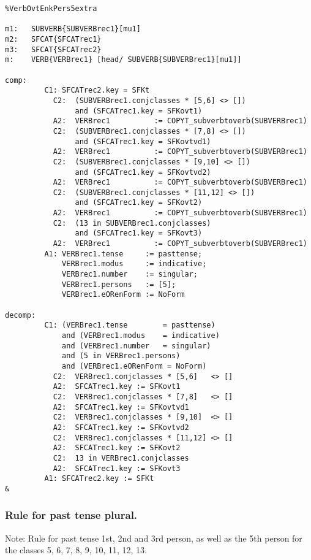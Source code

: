 \begin{verbatim}
%VerbOvtEnkPers5extra

m1:   SUBVERB{SUBVERBrec1}[mu1]
m2:   SFCAT{SFCATrec1}
m3:   SFCAT{SFCATrec2}
m:    VERB{VERBrec1} [head/ SUBVERB{SUBVERBrec1}[mu1]]

comp:
         C1: SFCATrec2.key = SFKt
           C2:  (SUBVERBrec1.conjclasses * [5,6] <> [])
                and (SFCATrec1.key = SFKovt1)
           A2:  VERBrec1          := COPYT_subverbtoverb(SUBVERBrec1)
           C2:  (SUBVERBrec1.conjclasses * [7,8] <> [])
                and (SFCATrec1.key = SFKovtvd1)
           A2:  VERBrec1          := COPYT_subverbtoverb(SUBVERBrec1)
           C2:  (SUBVERBrec1.conjclasses * [9,10] <> [])
                and (SFCATrec1.key = SFKovtvd2)
           A2:  VERBrec1          := COPYT_subverbtoverb(SUBVERBrec1)
           C2:  (SUBVERBrec1.conjclasses * [11,12] <> []) 
                and (SFCATrec1.key = SFKovt2)
           A2:  VERBrec1          := COPYT_subverbtoverb(SUBVERBrec1)
           C2:  (13 in SUBVERBrec1.conjclasses) 
                and (SFCATrec1.key = SFKovt3)
           A2:  VERBrec1          := COPYT_subverbtoverb(SUBVERBrec1)
         A1: VERBrec1.tense     := pasttense;
             VERBrec1.modus     := indicative;
             VERBrec1.number    := singular;
             VERBrec1.persons   := [5];
             VERBrec1.eORenForm := NoForm

decomp:
         C1: (VERBrec1.tense        = pasttense) 
             and (VERBrec1.modus    = indicative)
             and (VERBrec1.number   = singular)
             and (5 in VERBrec1.persons)
             and (VERBrec1.eORenForm = NoForm)
           C2:  VERBrec1.conjclasses * [5,6]   <> []
           A2:  SFCATrec1.key := SFKovt1
           C2:  VERBrec1.conjclasses * [7,8]   <> []
           A2:  SFCATrec1.key := SFKovtvd1
           C2:  VERBrec1.conjclasses * [9,10]  <> []
           A2:  SFCATrec1.key := SFKovtvd2
           C2:  VERBrec1.conjclasses * [11,12] <> []
           A2:  SFCATrec1.key := SFKovt2
           C2:  13 in VERBrec1.conjclasses
           A2:  SFCATrec1.key := SFKovt3
         A1: SFCATrec2.key := SFKt
&
\end{verbatim}
\newpage
\subsubsection{Rule for past tense plural.}

Note: Rule for past tense 1st, 2nd and 3rd person, as well as the 5th person 
      for the classes  5, 6, 7, 8, 9, 10, 11, 12, 13. 

